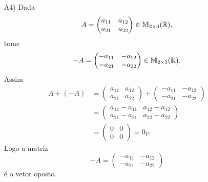 \documentclass[12pt]{exam}
\begin{document}
\begin{itemize}
        \item[A4)] Dada
        \[
        A = \begin{pmatrix} a_{11} & a_{12}\\a_{21} & a_{22}\end{pmatrix} \in \mathbb{M}_{2 \times 3}(\mathbb{R}),
        \]
        tome
        \[
        -A = \begin{pmatrix} -a_{11} & -a_{12}\\-a_{21} & -a_{22}\end{pmatrix} \in \mathbb{M}_{2 \times 3}(\mathbb{R}).
        \]
        Assim
        \begin{align*}
            A + (-A) & = \begin{pmatrix} a_{11} & a_{12}\\a_{21} & a_{22}\end{pmatrix} +
            \begin{pmatrix} -a_{11} & -a_{12}\\-a_{21} & -a_{22}\end{pmatrix}
            \\ &= \begin{pmatrix} a_{11} - a_{11} & a_{12} - a_{12}\\a_{21} - a_{21} & a_{22} - a_{22}\end{pmatrix}
            \\ &= \begin{pmatrix}0 & 0\\0 & 0\end{pmatrix} = 0_V.
        \end{align*}
        Logo a matriz
        \[
        -A = \begin{pmatrix} -a_{11} & -a_{12}\\-a_{21} & -a_{22}\end{pmatrix}
        \]
        é o vetor oposto.


\end{itemize}
\end{document}
